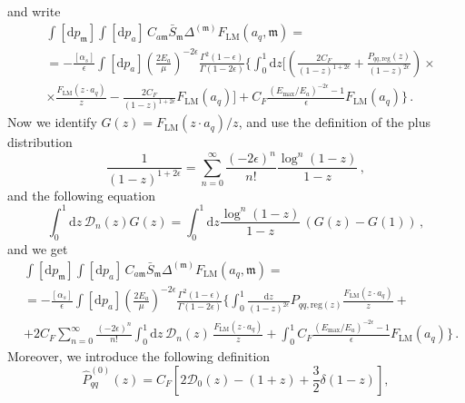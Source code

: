 \documentclass[a4paper, 12pt]{book}
\newcommand{\um}{\mathfrak{m}}
\begin{document}
and write
\begin{equation}
  \begin{split}
  & \int [\mathrm{d}p_\um]\int[\mathrm{d}p_a] \, C_{a\um} \bar{S}_\um \Delta^{(\um)} F_{\mathrm{LM}} (a_q, \um) = \\
  & = -\frac{[\alpha_s]}{\epsilon} \int[\mathrm{d}p_a] \left(\frac{2E_a}{\mu}\right)^{-2\epsilon} \frac{\Gamma^2(1-\epsilon)}{\Gamma(1-2\epsilon)} \Biggl\{ \int_{0}^{1} \mathrm{d}z \Biggl[  \left( \frac{2C_F}{(1-z)^{1+2\epsilon}} + \frac{P_{qq, \mathrm{reg}}(z)}{(1-z)^{2\epsilon}} \right) \times \\
  & \times \frac{F_{\mathrm{LM}}(z\cdot a_q)}{z} - \frac{2 C_F}{(1-z)^{1+2\epsilon}} F_{\mathrm{LM}}(a_q) \Biggr] + C_F \frac{(E_{\mathrm{max}}/E_a)^{-2\epsilon}-1}{\epsilon} F_{\mathrm{LM}}(a_q)  \Biggr\} \,.
  \label{coll-pass-1}
  \end{split}
\end{equation}
Now we identify $G(z)=F_{\mathrm{LM}}(z \cdot a_q)/z$, and use the definition of the plus distribution
\begin{equation}
  \frac{1}{(1-z)^{1+2\epsilon}} = \sum_{n=0}^{\infty} \frac{(-2\epsilon)^n}{n!} \frac{\log^n{(1-z)}}{1-z} \,,
\end{equation}
and the following equation
\begin{equation}
  \int_0^1 \mathrm{d}z \, \mathcal{D}_n(z) G(z) = \int_0^1 \mathrm{d}z \frac{\log^n{(1-z)}}{1-z} \, \left(G(z)-G(1)\right) \, ,
\end{equation}
and we get 
\begin{equation}
  \begin{split}
  & \int [\mathrm{d}p_\um]\int[\mathrm{d}p_a] \, C_{a\um} \bar{S}_\um \Delta^{(\um)} F_{\mathrm{LM}} (a_q, \um) = \\
  & = -\frac{[\alpha_s]}{\epsilon} \int[\mathrm{d}p_a] \left(\frac{2E_a}{\mu}\right)^{-2\epsilon} \frac{\Gamma^2(1-\epsilon)}{\Gamma(1-2\epsilon)} \Biggl\{ \int_0^1 \frac{\mathrm{d}z}{(1-z)^{2\epsilon}} P_{qq,\mathrm{reg}(z)} \frac{F_{\mathrm{LM}}(z\cdot a_q)}{z} + \\
  & + 2C_F \sum_{n=0}^{\infty} \frac{(-2\epsilon)^n}{n!} \int_0^1 \mathrm{d}z \, \mathcal{D}_n(z) \, \frac{F_{\mathrm{LM}}(z\cdot a_q)}{z} + \int_0^1 C_F \frac{(E_{\mathrm{max}}/E_a)^{-2\epsilon}-1}{\epsilon} F_{\mathrm{LM}}(a_q) \Biggr\} \, .  
  \label{coll-pass-2}
  \end{split}
\end{equation}
Moreover, we introduce the following definition
\begin{equation}
  \hat{P}_{qq}^{(0)}(z) = C_F \left[ 2 \mathcal{D}_0 (z)-(1+z)+\frac{3}{2} \delta(1-z) \right],
\end{equation}
\end{document}

